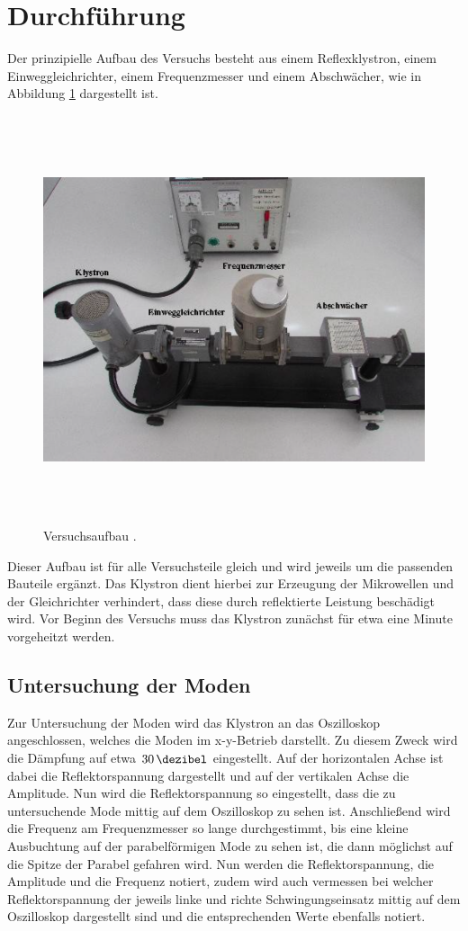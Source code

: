 \section{Durchführung}
\label{sec:Durchführung}
Der prinzipielle Aufbau des Versuchs besteht aus einem Reflexklystron, einem
Einweggleichrichter, einem Frequenzmesser und einem Abschwächer, wie in Abbildung
\ref{fig:aufbau} dargestellt ist.
\begin{figure}[H]
  \centering
  \includegraphics[height=12cm]{aufbau.png}
  \caption{Versuchsaufbau \cite{Skript}.}
  \label{fig:aufbau}
\end{figure}
Dieser Aufbau ist für alle Versuchsteile gleich und wird jeweils um die passenden
Bauteile ergänzt. Das Klystron dient hierbei zur Erzeugung der Mikrowellen und der
Gleichrichter verhindert, dass diese durch reflektierte Leistung beschädigt wird.
Vor Beginn des Versuchs muss das Klystron zunächst für etwa eine Minute vorgeheitzt
werden.

\subsection{Untersuchung der Moden}
Zur Untersuchung der Moden wird das Klystron an das Oszilloskop angeschlossen, welches
die Moden im x-y-Betrieb darstellt. Zu diesem Zweck wird die Dämpfung auf etwa
$\SI{30}{\dezibel}$ eingestellt. Auf der horizontalen Achse ist dabei die Reflektorspannung
dargestellt und auf der vertikalen Achse die Amplitude. Nun wird die Reflektorspannung
so eingestellt, dass die zu untersuchende Mode mittig auf dem Oszilloskop zu sehen ist.
Anschließend wird die Frequenz am Frequenzmesser so lange durchgestimmt, bis eine kleine
Ausbuchtung auf der parabelförmigen Mode zu sehen ist, die dann möglichst auf die
Spitze der Parabel gefahren wird. Nun werden die Reflektorspannung, die Amplitude und
die Frequenz notiert, zudem wird auch vermessen bei welcher Reflektorspannung der jeweils
linke und richte Schwingungseinsatz mittig auf dem Oszilloskop dargestellt sind und die
entsprechenden Werte ebenfalls notiert. \\

